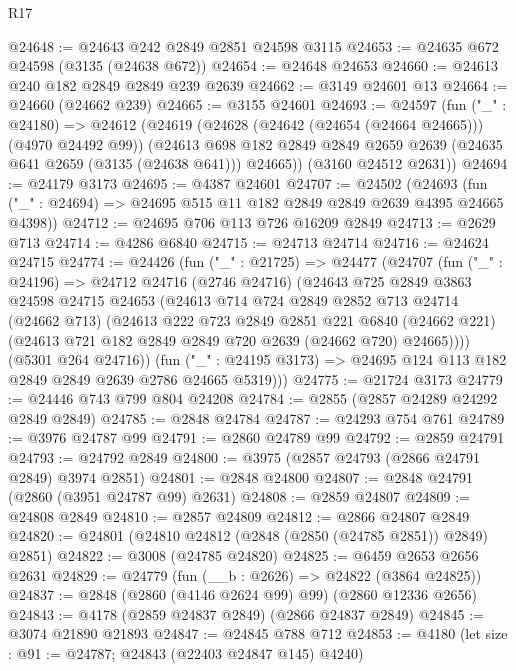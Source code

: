 \begin{lexlean}{R17}
\begin{coremodule}
@24648 := @24643 @242 @2849 @2851 @24598 @3115
@24653 := @24635 @672 @24598 (@3135 (@24638 @672))
@24654 := @24648 @24653
@24660 := @24613 @240 @182 @2849 @2849 @239 @2639
@24662 := @3149 @24601 @13
@24664 := @24660 (@24662 @239)
@24665 := @3155 @24601
@24693 := @24597
    (fun ("_" : @24180) =>
    @24612
      (@24619
        (@24628 (@24642 (@24654 (@24664 @24665))) (@4970 @24492 @99))
        (@24613 @698 @182 @2849 @2849 @2659 @2639 (@24635 @641 @2659 (@3135 (@24638 @641))) @24665))
      (@3160 @24512 @2631))
@24694 := @24179 @3173
@24695 := @4387 @24601
@24707 := @24502
    (@24693 (fun ("_" : @24694) => @24695 @515 @11 @182 @2849 @2849 @2639 @4395 @24665 @4398))
@24712 := @24695 @706 @113 @726 @16209 @2849
@24713 := @2629 @713
@24714 := @4286 @6840
@24715 := @24713 @24714
@24716 := @24624 @24715
@24774 := @24426
    (fun ("_" : @21725) =>
    @24477
      (@24707
        (fun ("_" : @24196) =>
        @24712
          @24716
          (@2746 @24716)
          (@24643
            @725
            @2849
            @3863
            @24598
            @24715
            @24653
            (@24613
              @714
              @724
              @2849
              @2852
              @713
              @24714
              (@24662 @713)
              (@24613
                @222
                @723
                @2849
                @2851
                @221
                @6840
                (@24662 @221)
                (@24613 @721 @182 @2849 @2849 @720 @2639 (@24662 @720) @24665))))
          (@5301 @264 @24716))
        (fun ("_" : @24195 @3173) => @24695 @124 @113 @182 @2849 @2849 @2639 @2786 @24665 @5319)))
@24775 := @21724 @3173
@24779 := @24446 @743 @799 @804 @24208
@24784 := @2855 (@2857 @24289 @24292 @2849 @2849)
@24785 := @2848 @24784
@24787 := @24293 @754 @761
@24789 := @3976 @24787 @99
@24791 := @2860 @24789 @99
@24792 := @2859 @24791
@24793 := @24792 @2849
@24800 := @3975 (@2857 @24793 (@2866 @24791 @2849) @3974 @2851)
@24801 := @2848 @24800
@24807 := @2848 @24791 (@2860 (@3951 @24787 @99) @2631)
@24808 := @2859 @24807
@24809 := @24808 @2849
@24810 := @2857 @24809
@24812 := @2866 @24807 @2849
@24820 := @24801 (@24810 @24812 (@2848 (@2850 (@24785 @2851)) @2849) @2851)
@24822 := @3008 (@24785 @24820)
@24825 := @6459 @2653 @2656 @2631
@24829 := @24779 (fun (__b : @2626) => @24822 (@3864 @24825))
@24837 := @2848 (@2860 (@4146 @2624 @99) @99) (@2860 @12336 @2656)
@24843 := @4178 (@2859 @24837 @2849) (@2866 @24837 @2849)
@24845 := @3074 @21890 @21893
@24847 := @24845 @788 @712
@24853 := @4180 (let size : @91 := @24787; @24843 (@22403 @24847 @145) @4240)

\end{coremodule}
\end{lexlean}
